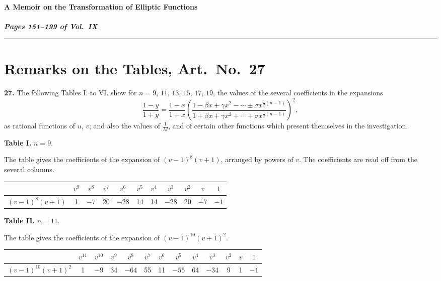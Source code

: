 \documentclass[12pt,a4paper]{article}
\begin{document}
\begin{center}
\Large\bfseries A Memoir on the Transformation of Elliptic Functions\\[0.5em]
\normalsize\mdseries [Paper 578]\\[0.5em]
\textit{Pages 151--199 of Vol.~IX}
\end{center}

\noindent\rule{\textwidth}{0.4pt}




\section*{Remarks on the Tables, Art.~No.~27}

\textbf{27.} The following Tables I. to VI. show for $n = 9$, $11$, $13$, $15$, $17$, $19$, the values of the several coefficients in the expansions
\[
\frac{1 - y}{1 + y} = \frac{1 - x}{1 + x}
\left(\frac{1 - \beta x + \gamma x^2 - \cdots \pm \sigma x^{\frac{1}{2}(n-1)}}
{1 + \beta x + \gamma x^2 + \cdots + \sigma x^{\frac{1}{2}(n-1)}}\right)^2,
\]
as rational functions of $u$, $v$; and also the values of $\frac{1}{M}$, and of certain other functions which present themselves in the investigation.

\medskip

\noindent\textbf{Table I.} $n = 9$.

\medskip

\noindent
The table gives the coefficients of the expansion of $(v-1)^8(v+1)$, arranged by powers of $v$. The coefficients are read off from the several columns.

\begin{center}
\begin{tabular}{|c|c|c|c|c|c|c|c|c|c|c|}
\hline
& $v^9$ & $v^8$ & $v^7$ & $v^6$ & $v^5$ & $v^4$ & $v^3$ & $v^2$ & $v$ & $1$ \\
\hline
$(v-1)^8(v+1)$ & 1 & $-7$ & 20 & $-28$ & 14 & 14 & $-28$ & 20 & $-7$ & $-1$ \\
\hline
\end{tabular}
\end{center}

\medskip

\noindent\textbf{Table II.} $n = 11$.

\medskip

\noindent
The table gives the coefficients of the expansion of $(v-1)^{10}(v+1)^2$.

\begin{center}
\begin{tabular}{|c|c|c|c|c|c|c|c|c|c|c|c|c|}
\hline
& $v^{11}$ & $v^{10}$ & $v^9$ & $v^8$ & $v^7$ & $v^6$ & $v^5$ & $v^4$ & $v^3$ & $v^2$ & $v$ & $1$ \\
\hline
$(v-1)^{10}(v+1)^2$ & 1 & $-9$ & 34 & $-64$ & 55 & 11 & $-55$ & 64 & $-34$ & 9 & 1 & $-1$ \\
\hline
\end{tabular}
\end{center}
\end{document}
